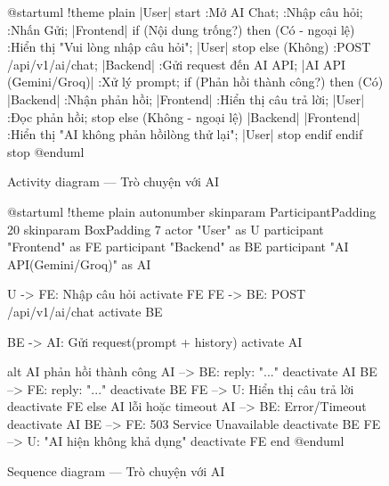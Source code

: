 \documentclass[12pt,a4paper]{report}
\begin{document}
\begin{figure}[H]
    \centering
    \begin{plantuml}
        @startuml
        !theme plain
        |User|
        start
        :Mở AI Chat;
        :Nhập câu hỏi;
        :Nhấn Gửi;
        |Frontend|
        if (Nội dung trống?) then (Có - ngoại lệ)
          :Hiển thị "Vui lòng nhập câu hỏi";
          |User|
          stop
        else (Không)
          :POST /api/v1/ai/chat;
          |Backend|
          :Gửi request đến AI API;
          |AI API (Gemini/Groq)|
          :Xử lý prompt;
          if (Phản hồi thành công?) then (Có)
            |Backend|
            :Nhận phản hồi;
            |Frontend|
            :Hiển thị câu trả lời;
            |User|
            :Đọc phản hồi;
            stop
          else (Không - ngoại lệ)
            |Backend|
            |Frontend|
            :Hiển thị "AI không phản hồi\nVui lòng thử lại";
            |User|
            stop
          endif
        endif
        stop
        @enduml
    \end{plantuml}
    \caption{Activity diagram --- Trò chuyện với AI}
\end{figure}

\begin{figure}[H]
    \centering
    \begin{plantuml}
        @startuml
        !theme plain
        autonumber
        skinparam ParticipantPadding 20
        skinparam BoxPadding 7
        actor "User" as U
        participant "Frontend" as FE
        participant "Backend" as BE
        participant "AI API\n(Gemini/Groq)" as AI

        U -> FE: Nhập câu hỏi
        activate FE
        FE -> BE: POST /api/v1/ai/chat
        activate BE

        BE -> AI: Gửi request\n(prompt + history)
        activate AI

        alt AI phản hồi thành công
          AI --> BE: { reply: "..." }
          deactivate AI
          BE --> FE: { reply: "..." }
          deactivate BE
          FE --> U: Hiển thị câu trả lời
          deactivate FE
        else AI lỗi hoặc timeout
          AI --> BE: Error/Timeout
          deactivate AI
          BE --> FE: 503 Service Unavailable
          deactivate BE
          FE --> U: "AI hiện không khả dụng"
          deactivate FE
        end
        @enduml
    \end{plantuml}
    \caption{Sequence diagram --- Trò chuyện với AI}
\end{figure}
\end{document}
